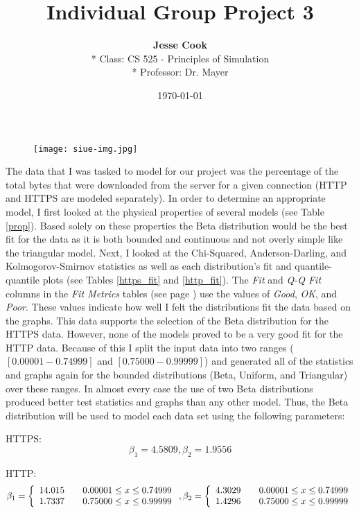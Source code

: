 \documentclass{article}
\author{
{\small\textbf{Jesse Cook}}\\*
{\small Class: CS 525 - Principles of Simulation}\\*
{\small Professor: Dr. Mayer}
}
\title{Individual Group Project 3}
\begin{document}
\date{\today}
\maketitle
\begin{figure}[h]
\texttt{[image: siue-img.jpg]}
\centering
\end{figure}

\pagebreak[4]


The data that I was tasked to model for our project was the percentage of the
total bytes that were downloaded from the server for a given connection (HTTP
and HTTPS are modeled separately).  In order to determine an appropriate
model, I first looked at the physical properties of several models (see Table
\ref{prop}). Based solely on these properties the Beta distribution would be
the best fit for the data as it is both bounded and continuous and not overly
simple like the triangular model. Next, I looked at the Chi-Squared,
Anderson-Darling, and Kolmogorov-Smirnov statistics as well as each
distribution's fit and quantile-quantile plots (see Tables \ref{https_fit} and
\ref{http_fit}). The {\em Fit} and {\em Q-Q Fit} columns in the {\em Fit
Metrics} tables (see page \pageref{https_fit}) use the values of {\em Good},
{\em OK}, and {\em Poor}. These values indicate how well I felt the
distributions fit the data based on the graphs.  This data supports the
selection of the Beta distribution for the HTTPS data.  However, none of the
models proved to be a very good fit for the HTTP data. Because of this I split
the input data into two ranges ($[0.00001-0.74999]$ and $[0.75000-0.99999]$)
and generated all of the statistics and graphs again for the bounded
distributions (Beta, Uniform, and Triangular) over these ranges.  In almost
every case the use of two Beta distributions produced better test statistics
and graphs than any other model. Thus, the Beta distribution will be used to
model each data set using the following parameters:

HTTPS:
\[
\beta_1 = 4.5809, \beta_2 = 1.9556
\]

HTTP:
\[
\beta_1 = \left\{
  \begin{array}{l l}
  14.015 & \quad 0.00001 \le x \le 0.74999 \\
  1.7337 & \quad 0.75000 \le x \le 0.99999 \\
  \end{array} \right.,
\beta_2 = \left\{
  \begin{array}{l l}
  4.3029 & \quad 0.00001 \le x \le 0.74999 \\
  1.4296 & \quad 0.75000 \le x \le 0.99999 \\
  \end{array} \right.
\]
\end{document}
